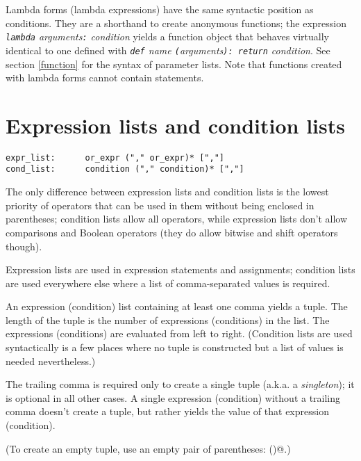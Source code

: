 Lambda forms (lambda expressions) have the same syntactic position as
conditions.  They are a shorthand to create anonymous functions; the
expression {\em {\tt lambda} arguments{\tt :} condition}
yields a function object that behaves virtually identical to one
defined with
{\em {\tt def} name {\tt (}arguments{\tt ): return} condition}.
See section \ref{function} for the syntax of
parameter lists.  Note that functions created with lambda forms cannot
contain statements.
\label{lambda}

\section{Expression lists and condition lists}

\begin{verbatim}
expr_list:      or_expr ("," or_expr)* [","]
cond_list:      condition ("," condition)* [","]
\end{verbatim}

The only difference between expression lists and condition lists is
the lowest priority of operators that can be used in them without
being enclosed in parentheses; condition lists allow all operators,
while expression lists don't allow comparisons and Boolean operators
(they do allow bitwise and shift operators though).

Expression lists are used in expression statements and assignments;
condition lists are used everywhere else where a list of
comma-separated values is required.

An expression (condition) list containing at least one comma yields a
tuple.  The length of the tuple is the number of expressions
(conditions) in the list.  The expressions (conditions) are evaluated
from left to right.  (Condition lists are used syntactically is a few
places where no tuple is constructed but a list of values is needed
nevertheless.)

The trailing comma is required only to create a single tuple (a.k.a. a
{\em singleton}); it is optional in all other cases.  A single
expression (condition) without a trailing comma doesn't create a
tuple, but rather yields the value of that expression (condition).

(To create an empty tuple, use an empty pair of parentheses:
\verb@()@.)
